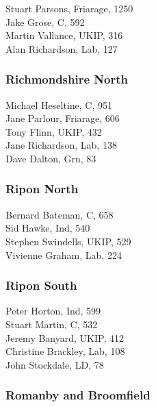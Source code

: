 \documentclass[a4paper,openany,10pt]{book}
\begin{document}


Stuart Parsons, Friarage, 1250\\
Jake Grose, C, 592\\
Martin Vallance, UKIP, 316\\
Alan Richardson, Lab, 127\\


\subsubsection*{Richmondshire North}



Michael Heseltine, C, 951\\
Jane Parlour, Friarage, 606\\
Tony Flinn, UKIP, 432\\
Jane Richardson, Lab, 138\\
Dave Dalton, Grn, 83\\


\subsubsection*{Ripon North}



Bernard Bateman, C, 658\\
Sid Hawke, Ind, 540\\
Stephen Swindells, UKIP, 529\\
Vivienne Graham, Lab, 224\\


\subsubsection*{Ripon South}



Peter Horton, Ind, 599\\
Stuart Martin, C, 532\\
Jeremy Banyard, UKIP, 412\\
Christine Brackley, Lab, 108\\
John Stockdale, LD, 78\\


\subsubsection*{Romanby and Broomfield}
\end{document}
